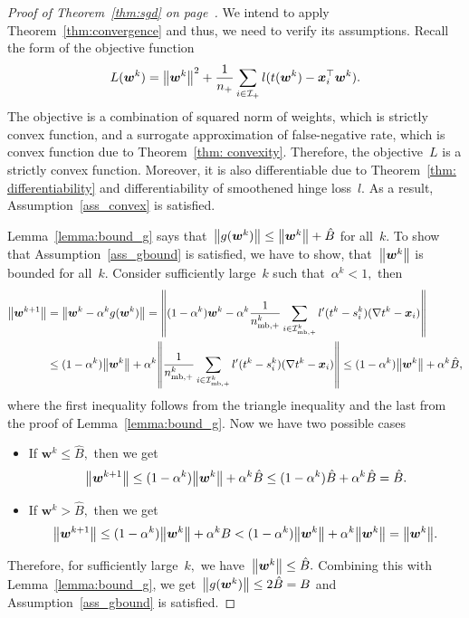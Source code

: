 \sgd*
\begin{proof}[Proof of Theorem~\ref{thm:sgd} on page~\pageref{thm:sgd}]
  We intend to apply Theorem~\ref{thm:convergence} and thus, we need to verify its assumptions. Recall the form of the objective function
  \begin{equation*}
    L(\bm{w}^k)
      = \norm{\bm{w}^k}^2 + \frac{1}{\npos} \sum_{i \in \Ipos} l(t(\bm{w}^k) - \bm{x}_i^{\top} \bm{w}^k).
  \end{equation*}
  The objective is a combination of squared norm of weights, which is strictly convex function, and a surrogate approximation of false-negative rate, which is convex function due to Theorem~\ref{thm: convexity}. Therefore, the objective~$L$ is a strictly convex function. Moreover, it is also differentiable due to Theorem~\ref{thm: differentiability} and differentiability of smoothened hinge loss~$l$. As a result, Assumption~\ref{ass_convex} is satisfied.

  Lemma~\ref{lemma:bound_g} says that~$\norm{g(\bm{w}^k)} \leq \norm{\bm{w}^k} + \hat{B}$ for all~$k.$ To show that Assumption~\ref{ass_gbound} is satisfied, we have to show, that~$\norm{\bm{w}^k}$ is bounded for all~$k.$ Consider sufficiently large~$k$ such that~$\alpha^k < 1,$ then
  \begin{align*}
    \norm{\bm{w}^{k+1}}
      & = \norm{\bm{w}^{k} - \alpha^k g(\bm{w}^{k})}
        = \norm{(1 - \alpha^k)\bm{w}^{k} - \alpha^k \frac{1}{\nmbpos^k} \sum_{i \in \Imbpos^k} l'(t^k - s_i^k)(\nabla t^k - \bm{x}_i)} \\
      & \leq (1 - \alpha^k) \norm{\bm{w}^{k}} + \alpha^k \norm{\frac{1}{\nmbpos^k} \sum_{i \in \Imbpos^k} l'(t^k - s_i^k)(\nabla t^k - \bm{x}_i)}
      \leq (1 - \alpha^k) \norm{\bm{w}^{k}} + \alpha^k \hat{B},
  \end{align*}
  where the first inequality follows from the triangle inequality and the last from the proof of Lemma~\ref{lemma:bound_g}. Now we have two possible cases
  \begin{itemize}
    \item If $\bm{w}^k \leq \hat{B},$ then we get
    \begin{equation*}
      \norm{\bm{w}^{k+1}}
        \leq (1 - \alpha^k) \norm{\bm{w}^{k}} + \alpha^k \hat{B}
        \leq (1 - \alpha^k) \hat{B} + \alpha^k \hat{B}
        = \hat{B}.
    \end{equation*}
    \item If $\bm{w}^k > \hat{B},$ then we get
    \begin{equation*}
      \norm{\bm{w}^{k+1}}
        \leq (1 - \alpha^k) \norm{\bm{w}^{k}} + \alpha^k B
        < (1 - \alpha^k) \norm{\bm{w}^{k}} + \alpha^k \norm{\bm{w}^{k}}
        = \norm{\bm{w}^{k}}.
    \end{equation*}
  \end{itemize}
  Therefore, for sufficiently large~$k,$ we have~$\norm{\bm{w}^{k}} \leq \hat{B}.$ Combining this with Lemma~\ref{lemma:bound_g}, we get~$\norm{g(\bm{w}^k)} \leq 2\hat{B} = B$ and Assumption~\ref{ass_gbound} is satisfied.


\end{proof}
